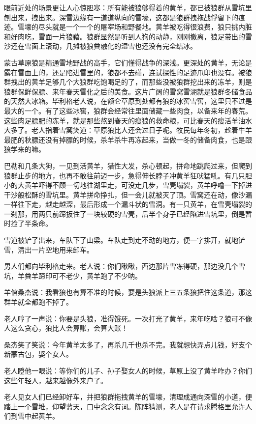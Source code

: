 \par 眼前近处的场景更让人心惊胆寒：所有能被狼够得着的黄羊，都已被狼群从雪坑里刨出来，拽出来。深雪边缘有一道道纵向的雪壕，这都是狼群拽拖战俘留下的痕迹。雪壕的尽头就是一个一个的屠宰场和野餐地。黄羊被吃得很浪费，狼只挑内脏和好肉吃，雪面一片狼藉。狼群显然是听到人狗的动静，刚刚撤离，狼足带出的雪沙还在雪面上滚动，几摊被狼粪融化的湿雪也还没有完全结冰。
\par 蒙古草原狼是精通雪地野战的高手，它们懂得战争的深浅。更深处的黄羊，无论是露在雪面上的，还是陷进雪里的，狼都不去碰，连试探性的足迹爪印也没有。被狼群拽出的黄羊足够几个大狼群吃饱喝足的了，而那些没被狼群挖出来的冻羊，则是狼群保鲜保膘、来年春天雪化之后的美食。这片广阔的雪窝雪湖就是狼群冬储食品的天然大冰箱。毕利格老人说，在额仑草原到处都有狼的冰窖雪窖，这里只不过是最大的一个。有了这些冰窖，狼群会经常往里面储藏一些肉食，以备来年的春荒。这些肉足膘肥的冻羊，就是那些熬到春天的瘦狼的救命粮，可比春天的瘦活羊油水大多了。老人指着雪窝笑道：草原狼比人还会过日子呢。牧民每年冬初，趁着牛羊最肥的秋膘还没有掉膘的时候，杀羊杀牛再冻起来，当做一冬的储备肉食，也是跟狼学来的嘛。
\par 巴勒和几条大狗，一见到活黄羊，猎性大发，杀心顿起，拼命地跳爬过来，但爬到狼群止步的地方，也再不敢往前迈一步，急得伸长脖子冲黄羊狂吠猛吼。有几只胆小的大黄羊吓得不顾一切地往湖里走，可没走几步，雪壳塌裂，黄羊呼噜一下掉进干沙般松酥的雪坑里。黄羊拼命挣扎，但一会儿就被灭了顶。雪窝还在动，像沙漏一样往下走，越走越深，最后形成一个漏斗状的雪洞。有一只黄羊，在雪壳塌裂的一刹那，用两只前蹄扳住了一块较硬的雪壳，后半个身子已经陷进雪坑里，倒是暂时捡了半条命。
\par 雪道被铲了出来，车队下了山梁。车队走到走不动的地方，便一字排开，就地铲雪，清出一片空地用来卸车。
\par 男人们都向毕利格走来。老人说：你们瞅瞅，西边那片雪冻得硬，那边没几个雪坑，羊粪羊蹄印可不老少，黄羊跑了不少呐。
\par 羊倌桑杰说：我看狼也有算不准的时候，要是头狼派上三五条狼把住这条道，那这群羊就全都跑不掉了。
\par 老人哼了一声说：你要是头狼，准得饿死。一次打光了黄羊，来年吃啥？狼可不像人这么贪心，狼比人会算账，会算大账！
\par 桑杰笑了笑说：今年黄羊太多了，再杀几千也杀不完。我就想快弄点儿钱，好支个新蒙古包，娶个女人。
\par 老人瞪他一眼说：等你们的儿子、孙子娶女人的时候，草原上没了黄羊咋办？你们这些年轻人，越来越像外来户了。
\par 老人见女人们已经卸好车，并把狼群拖拽黄羊的雪壕，清理成通向深雪的小道，便踏上一个雪堆，仰望蓝天，口中念念有词。陈阵猜测，老人是在请求腾格里允许人们到雪中起黄羊。
